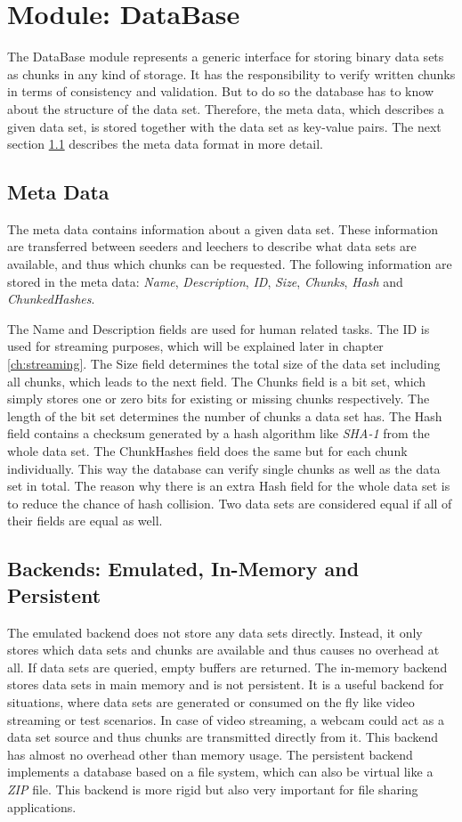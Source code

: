 \cleardoublepage
\chapter{Module: DataBase}
\label{ch:database}
The DataBase module represents a generic interface for storing binary data sets as chunks in any kind of storage. It has the responsibility to verify written chunks in terms of consistency and validation. But to do so the database has to know about the structure of the data set. Therefore, the meta data, which describes a given data set, is stored together with the data set as key-value pairs. The next section \ref{sec:metadata} describes the meta data format in more detail.


\section{Meta Data}
\label{sec:metadata}
The meta data contains information about a given data set. These information are transferred between seeders and leechers to describe what data sets are available, and thus which chunks can be requested. The following information are stored in the meta data: \emph{Name}, \emph{Description}, \emph{ID}, \emph{Size}, \emph{Chunks}, \emph{Hash} and \emph{ChunkedHashes}.

The Name and Description fields are used for human related tasks. The ID is used for streaming purposes, which will be explained later in chapter \ref{ch:streaming}. The Size field determines the total size of the data set including all chunks, which leads to the next field. The Chunks field is a bit set, which simply stores one or zero bits for existing or missing chunks respectively. The length of the bit set determines the number of chunks a data set has. The Hash field contains a checksum generated by a hash algorithm like \emph{SHA-1} from the whole data set. The ChunkHashes field does the same but for each chunk individually. This way the database can verify single chunks as well as the data set in total. The reason why there is an extra Hash field for the whole data set is to reduce the chance of hash collision. Two data sets are considered equal if all of their fields are equal as well.


\section{Backends: Emulated, In-Memory and Persistent}
\label{sec:backend}
The emulated backend does not store any data sets directly. Instead, it only stores which data sets and chunks are available and thus causes no overhead at all. If data sets are queried, empty buffers are returned. The in-memory backend stores data sets in main memory and is not persistent. It is a useful backend for situations, where data sets are generated or consumed on the fly like video streaming or test scenarios. In case of video streaming, a webcam could act as a data set source and thus chunks are transmitted directly from it. This backend has almost no overhead other than memory usage. The persistent backend implements a database based on a file system, which can also be virtual like a \emph{ZIP} file. This backend is more rigid but also very important for file sharing applications.


